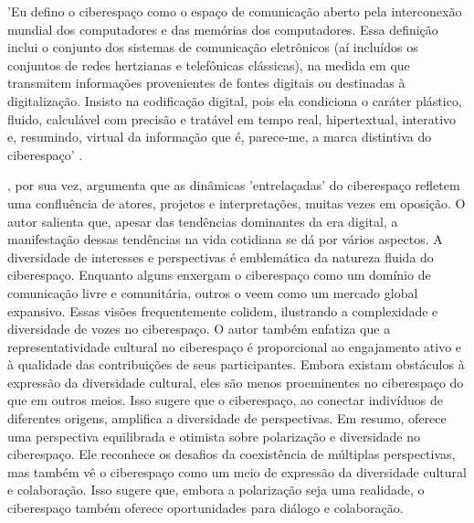 \begin{citacao}
	'Eu defino o ciberespaço como o espaço de comunicação aberto pela interconexão mundial dos computadores e das memórias dos computadores. Essa definição inclui o conjunto dos sistemas de comunicação eletrônicos (aí incluídos os conjuntos de redes hertzianas e telefônicas clássicas), na medida em que transmitem informações provenientes de fontes digitais ou destinadas à digitalização. Insisto na codificação digital, pois ela condiciona o caráter plástico, fluido, calculável com precisão e tratável em tempo real, hipertextual, interativo e, resumindo, virtual da informação que é, parece-me, a marca distintiva do ciberespaço' \cite[p. 102]{2010_Levy_BOOK}.
\end{citacao}

, por sua vez, argumenta que as dinâmicas 'entrelaçadas' do ciberespaço refletem uma confluência de atores, projetos e interpretações, muitas vezes em oposição. O autor salienta que, apesar das tendências dominantes da era digital, a manifestação dessas tendências na vida cotidiana se dá por vários aspectos. A diversidade de interesses e perspectivas é emblemática da natureza fluida do ciberespaço. Enquanto alguns enxergam o ciberespaço como um domínio de comunicação livre e comunitária, outros o veem como um mercado global expansivo. Essas visões frequentemente colidem, ilustrando a complexidade e diversidade de vozes no ciberespaço. O autor também enfatiza que a representatividade cultural no ciberespaço é proporcional ao engajamento ativo e à qualidade das contribuições de seus participantes. Embora existam obstáculos à expressão da diversidade cultural, eles são menos proeminentes no ciberespaço do que em outros meios. Isso sugere que o ciberespaço, ao conectar indivíduos de diferentes origens, amplifica a diversidade de perspectivas. Em resumo,  oferece uma perspectiva equilibrada e otimista sobre polarização e diversidade no ciberespaço. Ele reconhece os desafios da coexistência de múltiplas perspectivas, mas também vê o ciberespaço como um meio de expressão da diversidade cultural e colaboração. Isso sugere que, embora a polarização seja uma realidade, o ciberespaço também oferece oportunidades para diálogo e colaboração.

